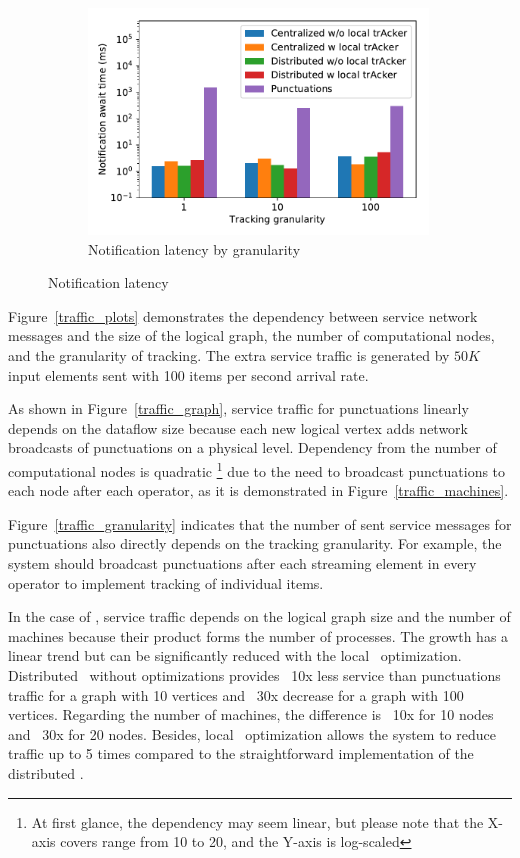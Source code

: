 \begin{figure}[t!]
\begin{subfigure}[b]{0.3\textwidth}
            \includegraphics[width=0.99\textwidth]{pics/notification_await_time_by_tracking_frequency_bars.pdf}
            \caption{Notification latency by granularity}
            \label{notification_granularity}
    \end{subfigure}
    \caption{Notification latency}
    \label{notification_latency}
\end{figure}

Figure~\ref{traffic_plots} demonstrates the dependency between service network messages and the size of the logical graph, the number of computational nodes, and the granularity of tracking. The extra service traffic is generated by $50K$ input elements sent with 100 items per second arrival rate. 

As shown in Figure~\ref{traffic_graph}, service traffic for punctuations linearly depends on the dataflow size because each new logical vertex adds network broadcasts of punctuations on a physical level. Dependency from the number of computational nodes is quadratic \footnote{At first glance, the dependency may seem linear, but please note that the X-axis covers range from 10 to 20, and the Y-axis is log-scaled} due to the need to broadcast punctuations to each node after each operator, as it is demonstrated in Figure~\ref{traffic_machines}. 

Figure~\ref{traffic_granularity} indicates that the number of sent service messages for punctuations also directly depends on the tracking granularity. For example, the system should broadcast punctuations after each streaming element in every operator to implement tracking of individual items. 

In the case of \tracker, service traffic depends on the logical graph size and the number of machines because their product forms the number of processes. The growth has a linear trend but can be significantly reduced with the local \tracker\ optimization. Distributed \tracker\ without optimizations provides ~10x less service than punctuations traffic for a graph with 10 vertices and ~30x decrease for a graph with 100 vertices. Regarding the number of machines, the difference is ~10x for 10 nodes and ~30x for 20 nodes. Besides, local \tracker\ optimization allows the system to reduce traffic up to 5 times compared to the straightforward implementation of the distributed \tracker.

